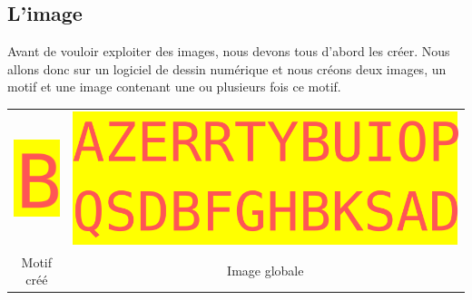 \documentclass[a4paper,12pt,titlepage]{report}
\begin{document}
	\subsection{L'image}
	Avant de vouloir exploiter des images, nous devons tous d'abord les créer. Nous allons donc sur un logiciel de dessin numérique et nous créons deux images, un motif et une image contenant une ou plusieurs fois ce motif.
	
		\begin{center}
			\begin{tabular}{cc}
				\includegraphics[scale=0.65]{../motif.png} & \includegraphics[scale=0.65]{../mot.png}\\
				Motif créé  & Image globale\\
			\end{tabular}
		\end{center}
		
\end{document}
